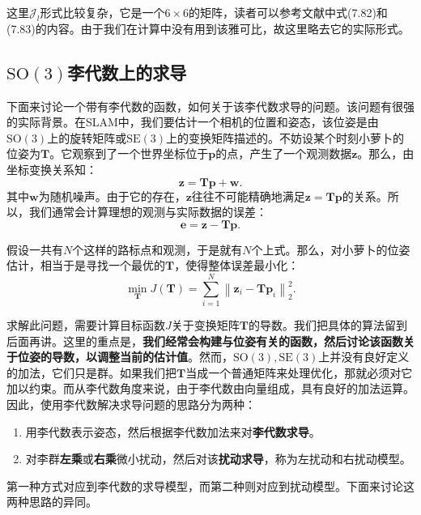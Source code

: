 这里$\bm{\mathcal{J}}_l$形式比较复杂，它是一个$6 \times 6$的矩阵，读者可以参考文献\cite{Barfoot2016}中式(7.82)和(7.83)的内容。由于我们在计算中没有用到该雅可比，故这里略去它的实际形式。

\enlargethispage{9pt}
\subsection{$\mathrm{SO}(3)$李代数上的求导}
下面来讨论一个带有李代数的函数，如何关于该李代数求导的问题。该问题有很强的实际背景。在SLAM中，我们要估计一个相机的位置和姿态，该位姿是由$\mathrm{SO}(3)$上的旋转矩阵或$\mathrm{SE}(3)$上的变换矩阵描述的。不妨设某个时刻小萝卜的位姿为$\bm{T}$。它观察到了一个世界坐标位于$\bm{p}$的点，产生了一个观测数据$\bm{z}$。那么，由坐标变换关系知：
\begin{equation}
\bm{z} = \bm{T} \bm{p} + \bm{w}.
\end{equation}
其中$\bm{w}$为随机噪声。由于它的存在，$\bm{z}$往往不可能精确地满足$\bm{z} = \bm{T} \bm{p}$的关系。所以，我们通常会计算理想的观测与实际数据的误差：
\begin{equation}
\bm{e} = \bm{z} - \bm{T} \bm{p}.
\end{equation}

假设一共有$N$个这样的路标点和观测，于是就有$N$个上式。那么，对小萝卜的位姿估计，相当于是寻找一个最优的$\bm{T}$，使得整体误差最小化：
\begin{equation}
\mathop {\min }\limits_{\bm{T}} J(\bm{T} ) = \sum_{i=1}^{N} \left\| {\bm{z}_i - \bm{Tp}_i} \right\|^2_2.
\end{equation}

求解此问题，需要计算目标函数$J$关于变换矩阵$\bm{T}$的导数。我们把具体的算法留到后面再讲。这里的重点是，\textbf{我们经常会构建与位姿有关的函数，然后讨论该函数关于位姿的导数，以调整当前的估计值}。然而，$\mathrm{SO}(3),\mathrm{SE}(3)$上并没有良好定义的加法，它们只是群。如果我们把$\bm{T}$当成一个普通矩阵来处理优化，那就必须对它加以约束。而从李代数角度来说，由于李代数由向量组成，具有良好的加法运算。因此，使用李代数解决求导问题的思路分为两种：

\begin{enumerate}
	\item 用李代数表示姿态，然后根据李代数加法来对\textbf{李代数求导}。
	\item 对李群\textbf{左乘}或\textbf{右乘}微小扰动，然后对该\textbf{扰动求导}，称为左扰动和右扰动模型。
\end{enumerate}

第一种方式对应到李代数的求导模型，而第二种则对应到扰动模型。下面来讨论这两种思路的异同。


